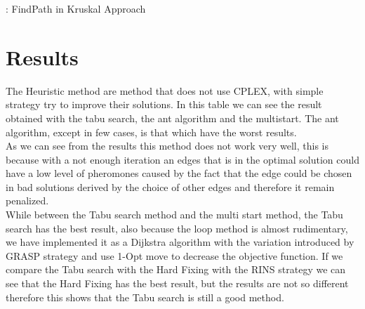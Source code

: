 \begin{algorithm}[H]
\caption{: FindPath in Kruskal Approach} \label{alg:SC}
\begin{algorithmic} 
\REPEAT
{}
\end{algorithmic}
\end{algorithm}

\section{Results}
The Heuristic method are method that does not use \textsc{CPLEX}, with simple strategy try to improve their solutions. In this table we can see the result obtained with the tabu search, the ant algorithm and the multistart. The ant algorithm, except in few cases, is that which have the worst results.\\
As we can see from the results this method does not work very well, this is because with a not enough iteration an edges that is in the optimal solution could have a low level of pheromones caused by the fact that the edge could be chosen in bad solutions derived by the choice of other edges and therefore it remain penalized.\\
While between the Tabu search method and the multi start method, the Tabu search has the best result, also because the loop method is almost rudimentary, we have implemented it as a Dijkstra algorithm with the variation introduced by GRASP strategy and use 1-Opt move to decrease the objective function. If we compare the Tabu search with the Hard Fixing with the RINS strategy we can see that the Hard Fixing has the best result, but the results are not so different therefore this shows that the Tabu search is still a good method.\\

